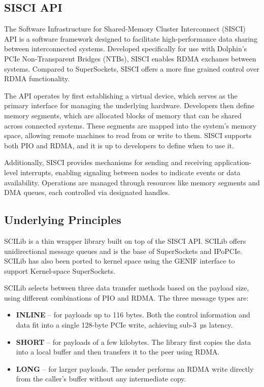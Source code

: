 \subsection{SISCI API}
The Software Infrastructure for Shared-Memory Cluster Interconnect (SISCI) API is a software framework designed to facilitate high-performance data sharing between interconnected systems. Developed specifically for use with Dolphin’s PCIe Non-Transparent Bridges (NTBs), SISCI enables RDMA exchanes between systems. Compared to SuperSockets, SISCI offers a more fine grained control over RDMA functionality.

The API operates by first establishing a virtual device, which serves as the primary interface for managing the underlying hardware. Developers then define memory segments, which are allocated blocks of memory that can be shared across connected systems. These segments are mapped into the system’s memory space, allowing remote machines to read from or write to them. SISCI supports both PIO and RDMA, and it is up to developers to define when to use it.

Additionally, SISCI provides mechanisms for sending and receiving application\allowbreak-level interrupts, enabling signaling between nodes to indicate events or data availability. Operations are managed through resources like memory segments and DMA queues, each controlled via designated handles.

\subsection{Underlying Principles}
SCILib is a thin wrapper library built on top of the SISCI API. SCILib offers unidirectional message queues and is the base of SuperSockets and IPoPCIe. SCILib has also been ported to kernel space using the
GENIF interface to support Kernel-space SuperSockets\cite{seifert2004scisocket}.

SCILib selects between three data transfer methods based on the payload size, using different combinations of PIO and RDMA. The three message types are:

\begin{itemize}
  \item \textbf{INLINE} – for payloads up to 116 bytes.  
        Both the control information and data fit into a single 128-byte PCIe write, achieving sub-3~µs latency.
  \item \textbf{SHORT} – for payloads of a few kilobytes.  
        The library first copies the data into a local buffer and then transfers it to the peer using RDMA.
  \item \textbf{LONG} – for larger payloads.  
        The sender performs an RDMA write directly from the caller’s buffer without any intermediate copy.
\end{itemize}

